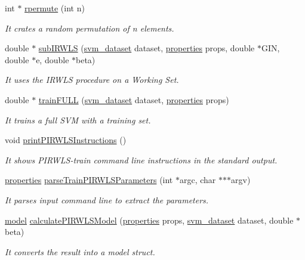 \begin{DoxyCompactItemize}
\item 
int $\ast$ \hyperlink{PIRWLS-train_8h_a9e75aabe599f48c66cbda89320d68a71}{rpermute} (int n)
\begin{DoxyCompactList}\small\item\em It crates a random permutation of n elements. \end{DoxyCompactList}\item 
double $\ast$ \hyperlink{PIRWLS-train_8h_af736cb71af5e7e4cb062977793905f4d}{sub\+I\+R\+W\+LS} (\hyperlink{structsvm__dataset}{svm\+\_\+dataset} dataset, \hyperlink{structproperties}{properties} props, double $\ast$G\+IN, double $\ast$e, double $\ast$beta)
\begin{DoxyCompactList}\small\item\em It uses the I\+R\+W\+LS procedure on a Working Set. \end{DoxyCompactList}\item 
double $\ast$ \hyperlink{PIRWLS-train_8h_ad719770a7de382211555ba831af2ea28}{train\+F\+U\+LL} (\hyperlink{structsvm__dataset}{svm\+\_\+dataset} dataset, \hyperlink{structproperties}{properties} props)
\begin{DoxyCompactList}\small\item\em It trains a full S\+VM with a training set. \end{DoxyCompactList}\item 
void \hyperlink{PIRWLS-train_8h_ac4a62e1a98c35f9d7e8996d58fe48523}{print\+P\+I\+R\+W\+L\+S\+Instructions} ()
\begin{DoxyCompactList}\small\item\em It shows P\+I\+R\+W\+L\+S-\/train command line instructions in the standard output. \end{DoxyCompactList}\item 
\hyperlink{structproperties}{properties} \hyperlink{PIRWLS-train_8h_a661bbe4aa2899bb306b7b509296068a2}{parse\+Train\+P\+I\+R\+W\+L\+S\+Parameters} (int $\ast$argc, char $\ast$$\ast$$\ast$argv)
\begin{DoxyCompactList}\small\item\em It parses input command line to extract the parameters. \end{DoxyCompactList}\item 
\hyperlink{structmodel}{model} \hyperlink{PIRWLS-train_8h_aeaa2f3c1d0f757826017dae7a83d7f8a}{calculate\+P\+I\+R\+W\+L\+S\+Model} (\hyperlink{structproperties}{properties} props, \hyperlink{structsvm__dataset}{svm\+\_\+dataset} dataset, double $\ast$beta)
\begin{DoxyCompactList}\small\item\em It converts the result into a model struct. \end{DoxyCompactList}\end{DoxyCompactItemize}



